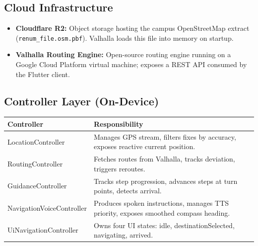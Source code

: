\documentclass[12pt]{article}
\begin{document}
\subsection{Cloud Infrastructure}
\begin{itemize}
    \item \textbf{Cloudflare R2:} Object storage hosting the campus OpenStreetMap extract (\texttt{renum\_file.osm.pbf}). Valhalla loads this file into memory on startup.
    \item \textbf{Valhalla Routing Engine:} Open-source routing engine running on a Google Cloud Platform virtual machine; exposes a REST API consumed by the Flutter client.
\end{itemize}

\subsection{Controller Layer (On-Device)}
\begin{tabularx}{\textwidth}{|l|X|}
\hline
\textbf{Controller} & \textbf{Responsibility} \\
\hline
LocationController & Manages GPS stream, filters fixes by accuracy, exposes reactive current position. \\
\hline
RoutingController & Fetches routes from Valhalla, tracks deviation, triggers reroutes. \\
\hline
GuidanceController & Tracks step progression, advances steps at turn points, detects arrival. \\
\hline
NavigationVoiceController & Produces spoken instructions, manages TTS priority, exposes smoothed compass heading. \\
\hline
UiNavigationController & Owns four UI states: idle, destinationSelected, navigating, arrived. \\
\hline
\end{tabularx}
\end{document}
